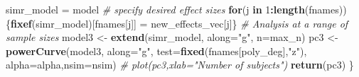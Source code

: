 \documentclass[]{article}
\newenvironment{Shaded}{\begin{snugshade}}{\end{snugshade}}
\newcommand{\KeywordTok}[1]{\textcolor[rgb]{0.13,0.29,0.53}{\textbf{#1}}}
\newcommand{\DataTypeTok}[1]{\textcolor[rgb]{0.13,0.29,0.53}{#1}}
\newcommand{\DecValTok}[1]{\textcolor[rgb]{0.00,0.00,0.81}{#1}}
\newcommand{\StringTok}[1]{\textcolor[rgb]{0.31,0.60,0.02}{#1}}
\newcommand{\CommentTok}[1]{\textcolor[rgb]{0.56,0.35,0.01}{\textit{#1}}}
\newcommand{\ControlFlowTok}[1]{\textcolor[rgb]{0.13,0.29,0.53}{\textbf{#1}}}
\newcommand{\OperatorTok}[1]{\textcolor[rgb]{0.81,0.36,0.00}{\textbf{#1}}}
\newcommand{\NormalTok}[1]{#1}
\begin{document}
\begin{Shaded}
\begin{Highlighting}[]
\NormalTok{ simr_model =}\StringTok{ }\NormalTok{model}
 \CommentTok{# specify desired effect sizes}
 \ControlFlowTok{for}\NormalTok{(j }\ControlFlowTok{in} \DecValTok{1}\OperatorTok{:}\KeywordTok{length}\NormalTok{(fnames))\{}\KeywordTok{fixef}\NormalTok{(simr_model)[fnames[j]] =}\StringTok{ }\NormalTok{new_effects_vec[j]\}}
 \CommentTok{# Analysis at a range of sample sizes}
\NormalTok{ model3 <-}\StringTok{ }\KeywordTok{extend}\NormalTok{(simr_model, }\DataTypeTok{along=}\StringTok{"g"}\NormalTok{, }\DataTypeTok{n=}\NormalTok{max_n)}
\NormalTok{ pc3 <-}\StringTok{ }\KeywordTok{powerCurve}\NormalTok{(model3, }\DataTypeTok{along=}\StringTok{"g"}\NormalTok{,}
                   \DataTypeTok{test=}\KeywordTok{fixed}\NormalTok{(fnames[poly_deg],}\StringTok{"z"}\NormalTok{),}
                   \DataTypeTok{alpha=}\NormalTok{alpha,}\DataTypeTok{nsim=}\NormalTok{nsim)}
 \CommentTok{# plot(pc3,xlab="Number of subjects")}
 \KeywordTok{return}\NormalTok{(pc3)}
\NormalTok{\}}


\end{Highlighting}
\end{Shaded}
\end{document}
